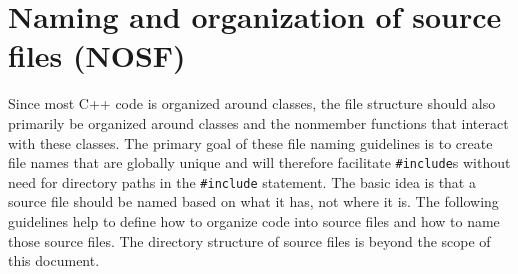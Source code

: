 %
\section{Naming and organization of source files (NOSF)}
\label{sec:NOSF}
%

Since most C++ code is organized around classes, the file structure should
also primarily be organized around classes and the nonmember functions that
interact with these classes.  The primary goal of these file naming guidelines
is to create file names that are globally unique and will therefore facilitate
{}\texttt{\#include}s without need for directory paths in the
{}\texttt{\#include} statement.  The basic idea is that a source file should
be named based on what it has, not where it is.  The following guidelines help
to define how to organize code into source files and how to name those
source files.  The directory structure of source files is beyond the scope of
this document.


